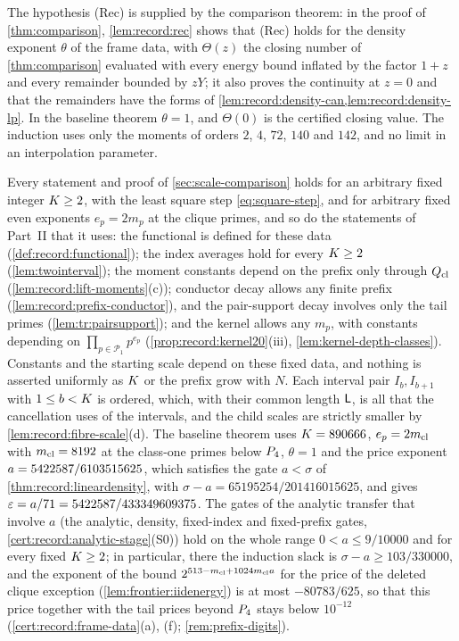 The hypothesis (Rec) is supplied by the comparison theorem: in the proof of
\cref{thm:comparison}, \cref{lem:record:rec} shows that (Rec) holds for the
density exponent $\theta$ of the frame data, with $\Theta(z)$ the closing
number of \cref{thm:comparison} evaluated with every energy bound inflated by
the factor $1+z$ and every remainder bounded by $zY$; it also proves the
continuity at $z=0$ and that the remainders have the forms of
\cref{lem:record:density-can,lem:record:density-lp}. In the baseline theorem
$\theta=1$, and $\Theta(0)$ is the certified closing value. The induction uses
only the moments of orders $2$, $4$, $72$, $140$ and $142$, and no limit in an
interpolation parameter.

\begin{remark}\label{rem:fixed-parameters}
Every statement and proof of \cref{sec:scale-comparison} holds for an
arbitrary fixed integer $K\ge2$, with the least square step
\eqref{eq:square-step}, and for arbitrary fixed even exponents $e_p=2m_p$ at
the clique primes, and so do the statements of Part~II that it uses:
the functional is defined for these data (\cref{def:record:functional}); the
index averages hold for every $K\ge2$ (\cref{lem:twointerval}); the
moment constants depend on the prefix only through $Q_{\rm cl}$
(\cref{lem:record:lift-moments}(c)); conductor decay allows any finite
prefix (\cref{lem:record:prefix-conductor}), and the pair-support decay
involves only the tail primes (\cref{lem:tr:pairsupport}); and the kernel
allows any $m_p$, with constants depending on $\prod_{p\in\mathcal P_1}p^{e_p}$
(\cref{prop:record:kernel20}(iii), \cref{lem:kernel-depth-classes}).
Constants and the starting scale depend on these fixed data, and nothing is
asserted uniformly as $K$ or the prefix grow with $N$. Each interval pair
$I_b,I_{b+1}$ with $1\le b<K$ is ordered, which, with their common length
$\mathsf L$, is all that the cancellation uses of the intervals, and the child
scales are strictly smaller by
\cref{lem:record:fibre-scale}(d). The baseline theorem uses $K=890666$,
$e_p=2m_{\mathrm{cl}}$ with $m_{\mathrm{cl}}=8192$ at the class-one primes below $P_4$,
$\theta=1$ and the price exponent $a=5422587/6103515625$, which satisfies the gate
$a<\sigma$ of \cref{thm:record:lineardensity}, with
$\sigma-a=65195254/201416015625$, and gives
$\varepsilon=a/71=5422587/433349609375$. The gates of the analytic transfer that involve
$a$ (the analytic, density, fixed-index and fixed-prefix gates,
\cref{cert:record:analytic-stage}(S0)) hold on the
whole range $0<a\le9/10000$ and for every fixed $K\ge2$; in particular,
there the induction slack is $\sigma-a\ge103/330000$, and the exponent of the
bound $2^{513-m_{\mathrm{cl}}+1024m_{\mathrm{cl}} a}$ for the price of the deleted clique exception
(\cref{lem:frontier:iidenergy}) is at most $-80783/625$, so that this price
together with the tail prices beyond $P_4$ stays below $10^{-12}$
(\cref{cert:record:frame-data}(a), (f); \cref{rem:prefix-digits}).
\end{remark}


